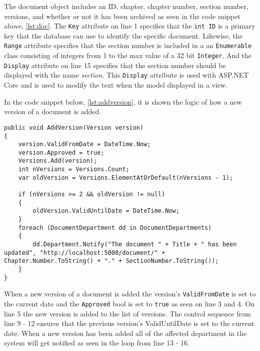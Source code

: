 
The document object includes an ID, chapter, chapter number, section number, versions, and whether or not it has been archived as seen in the code snippet above, \cref{lst:doc}.
The \texttt{Key} attribute on line 1 specifies that the \texttt{int ID} is a primary key that the database can use to identify the specific document.
Likewise, the \texttt{Range} attribute specifies that the section number is included in a an \texttt{Enumerable} class consisting of integers from 1 to the max value of a 32 bit \texttt{Integer}.
And the \texttt{Display} attribute on line 15 specifies that the section number should be displayed with the name \textit{section}.
This \texttt{Display} attribute is used with ASP.NET Core and is used to modify the text when the model displayed in a view.

In the code snippet below, \cref{lst:addversion}, it is shown the logic of how a new version of a document is added.
\\

\begin{lstlisting}[caption={Document Model: AddVersion}, label={lst:addversion}]
public void AddVersion(Version version)
{
	version.ValidFromDate = DateTime.Now;
	version.Approved = true;
	Versions.Add(version);
	int nVersions = Versions.Count;
	var oldVersion = Versions.ElementAtOrDefault(nVersions - 1);

	if (nVersions >= 2 && oldVersion != null)
	{
		oldVersion.ValidUntilDate = DateTime.Now;
	}
	foreach (DocumentDepartment dd in DocumentDepartments)
	{
		dd.Department.Notify("The document " + Title + " has been updated", "http://localhost:5000/document/" + Chapter.Number.ToString() + "." + SectionNumber.ToString());
	}
}
\end{lstlisting}

When a new version of a document is added the version's \texttt{ValidFromDate} is set to the current date and the \texttt{Approved} bool is set to \texttt{true} as seen on line 3 and 4.
On line 5 the new version is added to the list of versions.
The control sequence from line 9 - 12 ensures that the previous version's ValidUntilDate is set to the current date.
When a new version has been added all of the affected department in the system will get notified as seen in the loop from line 13 - 16.

